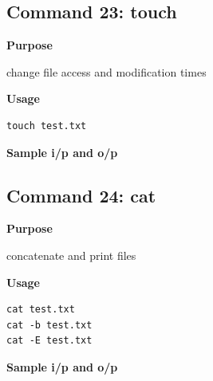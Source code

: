 \documentclass{article}
\begin{document}
\subsection{Command 23: touch} 
\textbf{Purpose}
\begin{flushleft}
 change file access and modification times
\end{flushleft}
\textbf{Usage}
\begin{verbatim}
touch test.txt
\end{verbatim}
\textbf{Sample i/p and o/p}
\begin{figure}[H] 
\end{figure}
\subsection{Command 24: cat} 
\textbf{Purpose}
\begin{flushleft}
 concatenate and print files
\end{flushleft}
\textbf{Usage}
\begin{verbatim}
cat test.txt
cat -b test.txt
cat -E test.txt
\end{verbatim}
\textbf{Sample i/p and o/p}
\begin{figure}[H] 
\end{figure}
\end{document}
